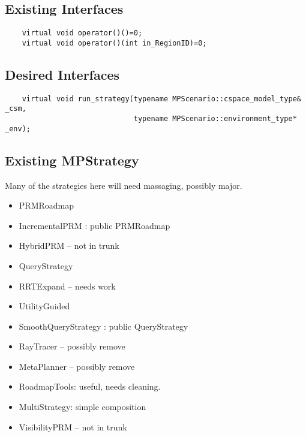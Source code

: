 \subsection{Existing Interfaces}
\begin{lstlisting}
    virtual void operator()()=0;
    virtual void operator()(int in_RegionID)=0;
\end{lstlisting}

\subsection{Desired Interfaces}
\begin{lstlisting}
    virtual void run_strategy(typename MPScenario::cspace_model_type& _csm,
                              typename MPScenario::environment_type* _env);        
\end{lstlisting}

\subsection{Existing MPStrategy}
Many of the strategies here will need massaging, possibly major.
\begin{itemize}
    \item PRMRoadmap
    \item IncrementalPRM : public PRMRoadmap
    \item HybridPRM -- not in trunk
    \item QueryStrategy
    \item RRTExpand -- needs work
    \item UtilityGuided
    \item SmoothQueryStrategy : public QueryStrategy
    \item RayTracer -- possibly remove
    \item MetaPlanner -- possibly remove
    \item RoadmapTools: useful, needs cleaning.
    \item MultiStrategy: simple composition
    \item VisibilityPRM -- not in trunk
\end{itemize}